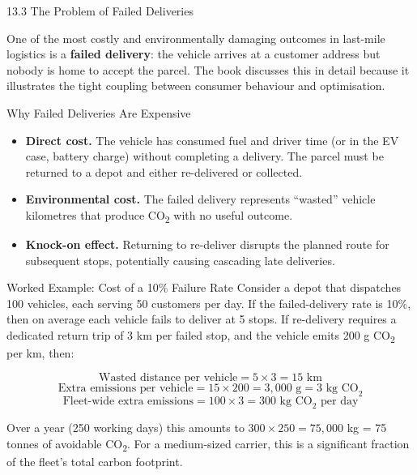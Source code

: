 \documentclass[aspectratio=169,10pt]{beamer}
\begin{document}
\begin{frame}[allowframebreaks]{13.3 The Problem of Failed Deliveries}

  One of the most costly and environmentally damaging outcomes in
  last-mile logistics is a \textbf{failed delivery}: the vehicle
  arrives at a customer address but nobody is home to accept the
  parcel.  The book discusses this in detail because it illustrates
  the tight coupling between consumer behaviour and optimisation.

  \bigskip
  \begin{block}{Why Failed Deliveries Are Expensive}
    \begin{itemize}
      \item \textbf{Direct cost.}
            The vehicle has consumed fuel and driver time
            (or in the EV case, battery charge) without completing
            a delivery.  The parcel must be returned to a depot
            and either re-delivered or collected.

      \item \textbf{Environmental cost.}
            The failed delivery represents ``wasted'' vehicle
            kilometres that produce CO\textsubscript{2} with no
            useful outcome.

      \item \textbf{Knock-on effect.}
            Returning to re-deliver disrupts the planned route
            for subsequent stops, potentially causing cascading
            late deliveries.
    \end{itemize}
  \end{block}

  \bigskip
  \begin{exampleblock}{Worked Example: Cost of a 10\% Failure Rate}
    Consider a depot that dispatches 100 vehicles, each serving
    50 customers per day.  If the failed-delivery rate is 10\%,
    then on average each vehicle fails to deliver at 5 stops.
    If re-delivery requires a dedicated return trip of 3 km
    per failed stop, and the vehicle emits 200 g CO\textsubscript{2}
    per km, then:

    \[
      \text{Wasted distance per vehicle} = 5 \times 3 = 15 \text{ km}
    \]
    \[
      \text{Extra emissions per vehicle} = 15 \times 200 = 3{,}000 \text{ g}
      = 3 \text{ kg CO}_2
    \]
    \[
      \text{Fleet-wide extra emissions} = 100 \times 3 = 300 \text{ kg CO}_2
      \text{ per day}
    \]

    Over a year (250 working days) this amounts to
    $300 \times 250 = 75{,}000$ kg = 75 tonnes of avoidable CO\textsubscript{2}.
    For a medium-sized carrier, this is a significant fraction of
    the fleet's total carbon footprint.
  \end{exampleblock}


\end{frame}
\end{document}
